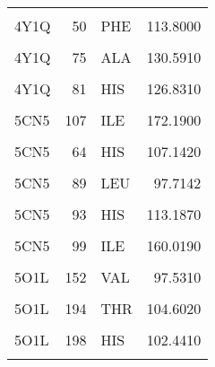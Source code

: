 \begin{table}
\begin{tabular}{lrlr}
			\addlinespace
			\cellcolor{gray!6}{4Y1Q} & \cellcolor{gray!6}{40} & \cellcolor{gray!6}{ARG} & \cellcolor{gray!6}{121.1480}\\
			4Y1Q & 50 & PHE & 113.8000\\
			\cellcolor{gray!6}{4Y1Q} & \cellcolor{gray!6}{55} & \cellcolor{gray!6}{TYR} & \cellcolor{gray!6}{130.2460}\\
			4Y1Q & 75 & ALA & 130.5910\\
			\cellcolor{gray!6}{4Y1Q} & \cellcolor{gray!6}{77} & \cellcolor{gray!6}{PHE} & \cellcolor{gray!6}{49.1641}\\
			\addlinespace
			4Y1Q & 81 & HIS & 126.8310\\
			\cellcolor{gray!6}{5CN5} & \cellcolor{gray!6}{104} & \cellcolor{gray!6}{LEU} & \cellcolor{gray!6}{86.5002}\\
			5CN5 & 107 & ILE & 172.1900\\
			\cellcolor{gray!6}{5CN5} & \cellcolor{gray!6}{43} & \cellcolor{gray!6}{PHE} & \cellcolor{gray!6}{99.8337}\\
			5CN5 & 64 & HIS & 107.1420\\
			\addlinespace
			\cellcolor{gray!6}{5CN5} & \cellcolor{gray!6}{68} & \cellcolor{gray!6}{VAL} & \cellcolor{gray!6}{104.0070}\\
			5CN5 & 89 & LEU & 97.7142\\
			\cellcolor{gray!6}{5CN5} & \cellcolor{gray!6}{92} & \cellcolor{gray!6}{SER} & \cellcolor{gray!6}{111.5180}\\
			5CN5 & 93 & HIS & 113.1870\\
			\cellcolor{gray!6}{5CN5} & \cellcolor{gray!6}{97} & \cellcolor{gray!6}{HIS} & \cellcolor{gray!6}{177.3970}\\
			\addlinespace
			5CN5 & 99 & ILE & 160.0190\\
			\cellcolor{gray!6}{5O1L} & \cellcolor{gray!6}{148} & \cellcolor{gray!6}{GLU} & \cellcolor{gray!6}{94.5791}\\
			5O1L & 152 & VAL & 97.5310\\
			\cellcolor{gray!6}{5O1L} & \cellcolor{gray!6}{171} & \cellcolor{gray!6}{LEU} & \cellcolor{gray!6}{140.5170}\\
			5O1L & 194 & THR & 104.6020\\
			\addlinespace
			\cellcolor{gray!6}{5O1L} & \cellcolor{gray!6}{197} & \cellcolor{gray!6}{VAL} & \cellcolor{gray!6}{117.0650}\\
			5O1L & 198 & HIS & 102.4410\\
			\cellcolor{gray!6}{5O1L} & \cellcolor{gray!6}{222} & \cellcolor{gray!6}{ILE} & \cellcolor{gray!6}{133.4090}\\

\end{tabular}
\end{table}

